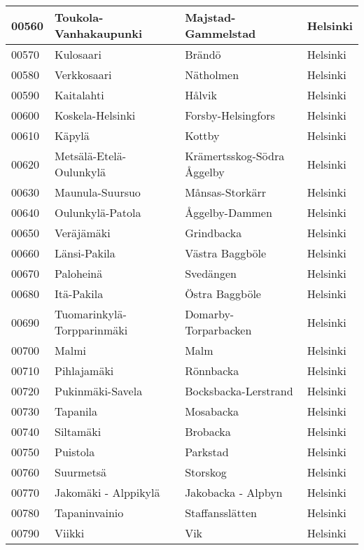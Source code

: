 \begin{longtable}{llll}
    00560 & Toukola-Vanhakaupunki & Majstad-Gammelstad & Helsinki \\ [0.25ex] \hline
    00570 & Kulosaari & Brändö & Helsinki \\ [0.25ex] \hline
    00580 & Verkkosaari & Nätholmen & Helsinki \\ [0.25ex] \hline
    00590 & Kaitalahti & Hålvik & Helsinki \\ [0.25ex] \hline
    00600 & Koskela-Helsinki & Forsby-Helsingfors & Helsinki \\ [0.25ex] \hline
    00610 & Käpylä & Kottby & Helsinki \\ [0.25ex] \hline
    00620 & Metsälä-Etelä-Oulunkylä & Krämertsskog-Södra Åggelby & Helsinki \\ [0.25ex] \hline
    00630 & Maunula-Suursuo & Månsas-Storkärr & Helsinki \\ [0.25ex] \hline
    00640 & Oulunkylä-Patola & Åggelby-Dammen & Helsinki \\ [0.25ex] \hline
    00650 & Veräjämäki & Grindbacka & Helsinki \\ [0.25ex] \hline
    00660 & Länsi-Pakila & Västra Baggböle & Helsinki \\ [0.25ex] \hline
    00670 & Paloheinä & Svedängen & Helsinki \\ [0.25ex] \hline
    00680 & Itä-Pakila & Östra Baggböle & Helsinki \\ [0.25ex] \hline
    00690 & Tuomarinkylä-Torpparinmäki & Domarby-Torparbacken & Helsinki \\ [0.25ex] \hline
    00700 & Malmi & Malm & Helsinki \\ [0.25ex] \hline
    00710 & Pihlajamäki & Rönnbacka & Helsinki \\ [0.25ex] \hline
    00720 & Pukinmäki-Savela & Bocksbacka-Lerstrand & Helsinki \\ [0.25ex] \hline
    00730 & Tapanila & Mosabacka & Helsinki \\ [0.25ex] \hline
    00740 & Siltamäki & Brobacka & Helsinki \\ [0.25ex] \hline
    00750 & Puistola & Parkstad & Helsinki \\ [0.25ex] \hline
    00760 & Suurmetsä & Storskog & Helsinki \\ [0.25ex] \hline
    00770 & Jakomäki - Alppikylä & Jakobacka - Alpbyn & Helsinki \\ [0.25ex] \hline
    00780 & Tapaninvainio & Staffansslätten & Helsinki \\ [0.25ex] \hline
    00790 & Viikki & Vik & Helsinki \\ [0.25ex] \hline

\end{longtable}

